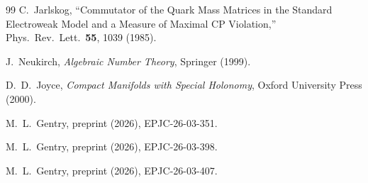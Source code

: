 \documentclass[11pt,a4paper]{article}
\begin{document}
\begin{thebibliography}{99}
C.~Jarlskog,
``Commutator of the Quark Mass Matrices in the Standard Electroweak 
Model and a Measure of Maximal CP Violation,''
Phys.\ Rev.\ Lett.\ \textbf{55}, 1039 (1985).

J.~Neukirch,
\emph{Algebraic Number Theory},
Springer (1999).

D.~D.~Joyce,
\emph{Compact Manifolds with Special Holonomy},
Oxford University Press (2000).


M.~L.~Gentry,
preprint (2026), EPJC-26-03-351.

M.~L.~Gentry,
preprint (2026), EPJC-26-03-398.

M.~L.~Gentry,
preprint (2026), EPJC-26-03-407.
\end{thebibliography}
\end{document}
